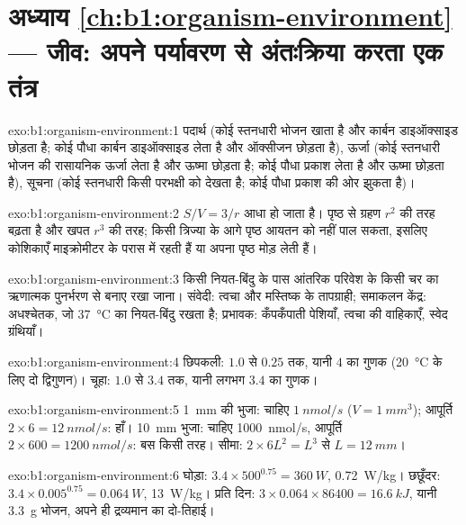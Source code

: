 \section*{अध्याय \ref{ch:b1:organism-environment} --- जीव: अपने पर्यावरण से अंतःक्रिया करता एक तंत्र}

\begin{solution}{exo:b1:organism-environment:1}
पदार्थ (कोई स्तनधारी भोजन खाता है और कार्बन डाइऑक्साइड छोड़ता है; कोई
पौधा कार्बन डाइऑक्साइड लेता है और ऑक्सीजन छोड़ता है), ऊर्जा (कोई स्तनधारी
भोजन की रासायनिक ऊर्जा लेता है और ऊष्मा छोड़ता है; कोई पौधा प्रकाश लेता
है और ऊष्मा छोड़ता है), सूचना (कोई स्तनधारी किसी परभक्षी को देखता है; कोई
पौधा प्रकाश की ओर झुकता है)।
\end{solution}

\begin{solution}{exo:b1:organism-environment:2}
$S/V = 3/r$ आधा हो जाता है। पृष्ठ से ग्रहण $r^2$ की तरह बढ़ता है और
खपत $r^3$ की तरह; किसी त्रिज्या के आगे पृष्ठ आयतन को नहीं पाल सकता,
इसलिए कोशिकाएँ माइक्रोमीटर के परास में रहती हैं या अपना पृष्ठ मोड़ लेती हैं।
\end{solution}

\begin{solution}{exo:b1:organism-environment:3}
किसी नियत-बिंदु के पास आंतरिक परिवेश के किसी चर का ऋणात्मक पुनर्भरण से
बनाए रखा जाना। संवेदी: त्वचा और मस्तिष्क के तापग्राही; समाकलन केंद्र:
अधश्चेतक, जो \qty{37}{\celsius} का नियत-बिंदु रखता है; प्रभावक: कँपकँपाती
पेशियाँ, त्वचा की वाहिकाएँ, स्वेद ग्रंथियाँ।
\end{solution}

\begin{solution}{exo:b1:organism-environment:4}
छिपकली: $1.0$ से $0.25$ तक, यानी $4$ का गुणक (\qty{20}{\celsius} के लिए
दो द्विगुणन)। चूहा: $1.0$ से $3.4$ तक, यानी लगभग
$3.4$ का गुणक।
\end{solution}

\begin{solution}{exo:b1:organism-environment:5}
\qty{1}{mm} की भुजा: चाहिए $\qty{1}{nmol/s}$ ($V = \qty{1}{mm^3}$); आपूर्ति
$2\times 6 = \qty{12}{nmol/s}$: हाँ। \qty{10}{mm} भुजा: चाहिए
\qty{1000}{nmol/s}, आपूर्ति $2\times 600 = \qty{1200}{nmol/s}$: बस
किसी तरह। सीमा: $2\times 6L^2 = L^3$ से $L = \qty{12}{mm}$।
\end{solution}

\begin{solution}{exo:b1:organism-environment:6}
घोड़ा: $3.4\times 500^{0.75} = \qty{360}{W}$, \qty{0.72}{W/kg}। छछूँदर:
$3.4\times 0.005^{0.75} = \qty{0.064}{W}$, \qty{13}{W/kg}। प्रति दिन:
$3\times 0.064\times 86400 = \qty{16.6}{kJ}$, यानी \qty{3.3}{g} भोजन,
अपने ही द्रव्यमान का दो-तिहाई।
\end{solution}

